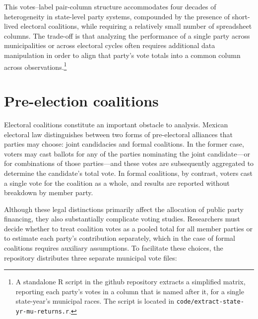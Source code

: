 \documentclass[letter,12pt]{article}
\begin{document}
This votes--label pair-column structure accommodates four decades of heterogeneity in state-level party systems, compounded by the presence of short-lived electoral coalitions, while requiring a relatively small number of spreadsheet columns. The trade-off is that analyzing the performance of a single party across municipalities or across electoral cycles often requires additional data manipulation in order to align that party's vote totals into a common column across observations.\footnote{A standalone R script in the github repository extracts a simplified matrix, reporting each party's votes in a column that is named after it, for a single state-year's municipal races. The script is located in \verb|code/extract-state-yr-mu-returns.r|.}

\section{Pre-election coalitions}\label{S:coalitions}

Electoral coalitions constitute an important obstacle to analysis. Mexican electoral law distinguishes between two forms of pre-electoral alliances that parties may choose: joint candidacies and formal coalitions. In the former case, voters may cast ballots for any of the parties nominating the joint candidate---or for combinations of those parties---and these votes are subsequently aggregated to determine the candidate's total vote. In formal coalitions, by contrast, voters cast a single vote for the coalition as a whole, and results are reported without breakdown by member party.

Although these legal distinctions primarily affect the allocation of public party financing, they also substantially complicate voting studies. Researchers must decide whether to treat coalition votes as a pooled total for all member parties or to estimate each party's contribution separately, which in the case of formal coalitions requires auxiliary assumptions. To facilitate these choices, the repository distributes three separate municipal vote files:
\end{document}
